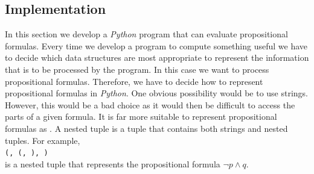 \subsection{Implementation} 
In this section we develop a \textsl{Python} program that can evaluate propositional formulas.
Every time we develop a program to compute something useful we have to decide which data structures are
most appropriate to represent the information that is to be processed by the program.  In this case we want to
process propositional formulas.  Therefore, we have to decide how to represent propositional formulas in
\textsl{Python}.  One obvious possibility would be to use strings.  However, this would be a bad choice as it
would then be difficult to access the parts of a given formula.  It is far more suitable to represent
propositional formulas as .  A nested tuple is a tuple that contains both strings and
nested tuples.  For example,
\\[0.2cm]
\hspace*{1.3cm}
\texttt{(\tsq{$\wedge$}, (\tsq{$\neg$}, ), )}
\\[0.2cm]
is a nested tuple that represents the propositional formula $\neg p \wedge q$.

